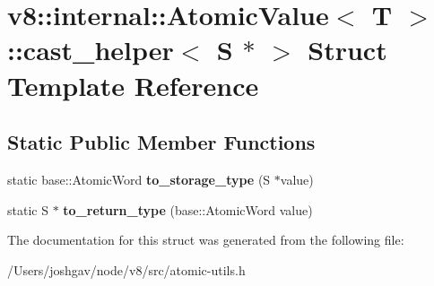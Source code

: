 \hypertarget{structv8_1_1internal_1_1_atomic_value_1_1cast__helper_3_01_s_01_5_01_4}{}\section{v8\+:\+:internal\+:\+:Atomic\+Value$<$ T $>$\+:\+:cast\+\_\+helper$<$ S $\ast$ $>$ Struct Template Reference}
\label{structv8_1_1internal_1_1_atomic_value_1_1cast__helper_3_01_s_01_5_01_4}
\subsection*{Static Public Member Functions}
\begin{DoxyCompactItemize}
\item 
static base\+::\+Atomic\+Word {\bfseries to\+\_\+storage\+\_\+type} (S $\ast$value)\hypertarget{structv8_1_1internal_1_1_atomic_value_1_1cast__helper_3_01_s_01_5_01_4_ac7a4e5bab9ac192390a168d46a9b6e66}{}\label{structv8_1_1internal_1_1_atomic_value_1_1cast__helper_3_01_s_01_5_01_4_ac7a4e5bab9ac192390a168d46a9b6e66}

\item 
static S $\ast$ {\bfseries to\+\_\+return\+\_\+type} (base\+::\+Atomic\+Word value)\hypertarget{structv8_1_1internal_1_1_atomic_value_1_1cast__helper_3_01_s_01_5_01_4_ab99da33052c70ac49ecc4f0a7fe6269e}{}\label{structv8_1_1internal_1_1_atomic_value_1_1cast__helper_3_01_s_01_5_01_4_ab99da33052c70ac49ecc4f0a7fe6269e}

\end{DoxyCompactItemize}


The documentation for this struct was generated from the following file\+:\begin{DoxyCompactItemize}
\item 
/\+Users/joshgav/node/v8/src/atomic-\/utils.\+h\end{DoxyCompactItemize}
